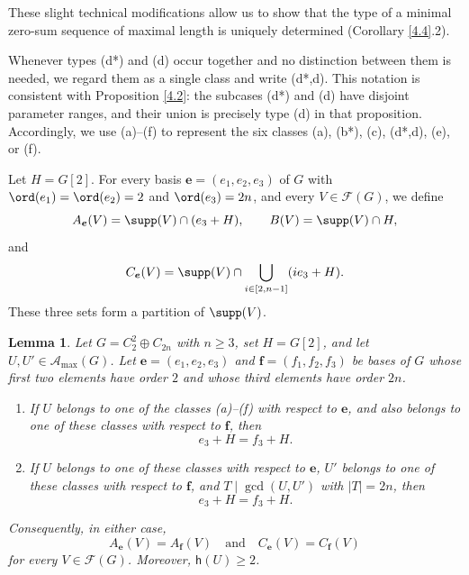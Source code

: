 \documentclass[a4paper, 10pt]{amsart}
\theoremstyle{plain}
\newtheorem{lemma}[theorem]{\bf Lemma}
\theoremstyle{definition}
\numberwithin{equation}{section}
\begin{document}
These slight technical modifications allow us to show that the type of a minimal zero-sum sequence of maximal length is uniquely determined (Corollary \ref{4.4}.2). {
Whenever types (d*) and (d) occur together and no distinction between them is needed, we regard them as a single class and write (d*,d). This notation is consistent with Proposition \ref{4.2}: the subcases (d*) and (d) have disjoint parameter ranges, and their union is precisely type (d) in that proposition. Accordingly, we use (a)--(f) to represent the six classes (a), (b*), (c), (d*,d), (e), or (f).

Let $H=G[2]$. For every basis $\boldsymbol e=(e_1,e_2,e_3)$ of $G$ with $\ord(e_1)=\ord(e_2)=2$ and $\ord(e_3)=2n$, and every $V\in\mathcal F(G)$, we define
\[
A_{\boldsymbol e}(V)=\supp(V)\cap(e_3+H),\qquad B(V)=\supp(V)\cap H,
\]
and
\[
C_{\boldsymbol e}(V)=\supp(V)\cap\bigcup_{i\in[2,n-1]}(ie_3+H).
\]
These three sets form a partition of $\supp(V)$.

\begin{lemma}\label{4.3}
	Let $G=C_2^2\oplus C_{2n}$ with $n\ge3$, set $H=G[2]$, and let $U,U'\in\mathcal A_{\max}(G)$. Let $\boldsymbol e=(e_1,e_2,e_3)$ and $\boldsymbol f=(f_1,f_2,f_3)$ be bases of $G$ whose first two elements have order $2$ and whose third elements have order $2n$.
	
	\begin{enumerate}
		\item If $U$ belongs to one of the classes (a)--(f) with respect to $\boldsymbol e$, and also belongs to one of these classes with respect to $\boldsymbol f$, then
		\[
		e_3+H=f_3+H.
		\]
		\item If $U$ belongs to one of these classes with respect to $\boldsymbol e$, $U'$ belongs to one of these classes with respect to $\boldsymbol f$, and $T\mid\gcd(U,U')$ with $|T|=2n$, then
		\[
		e_3+H=f_3+H.
		\]
	\end{enumerate}
	Consequently, in either case,
	\[
	A_{\boldsymbol e}(V)=A_{\boldsymbol f}(V)
	\quad\text{and}\quad
	C_{\boldsymbol e}(V)=C_{\boldsymbol f}(V)
	\]
	for every $V\in\mathcal F(G)$. Moreover, $\mathsf h(U)\ge2$.
\end{lemma}

}
\end{document}
